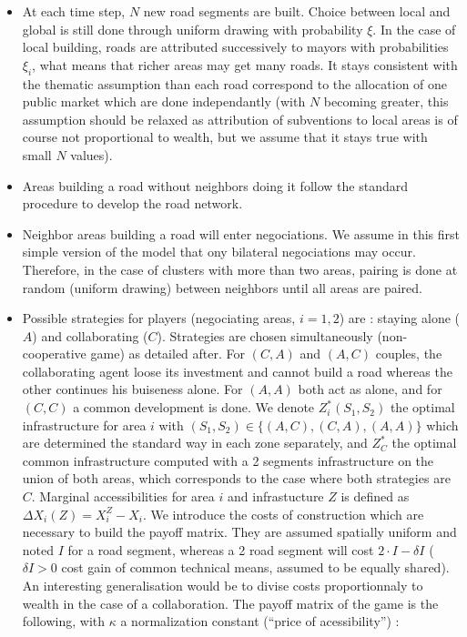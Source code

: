 \begin{itemize}

\item At each time step, $N$ new road segments are built. Choice between local and global is still done through uniform drawing with probability $\xi$. In the case of local building, roads are attributed successively to mayors with probabilities $\xi_i$, what means that richer areas may get many roads. It stays consistent with the thematic assumption than each road correspond to the allocation of one public market which are done independantly (with $N$ becoming greater, this assumption should be relaxed as attribution of subventions to local areas is of course not proportional to wealth, but we assume that it stays true with small $N$ values). 

\item Areas building a road without neighbors doing it follow the standard procedure to develop the road network.

\item Neighbor areas building a road will enter negociations. We assume in this first simple version of the model that ony bilateral negociations may occur. Therefore, in the case of clusters with more than two areas, pairing is done at random (uniform drawing) between neighbors until all areas are paired.

\item Possible strategies for players (negociating areas, $i=1,2$) are : staying alone ($A$) and collaborating ($C$). Strategies are chosen simultaneously (non-cooperative game) as detailed after. For $(C,A)$ and $(A,C)$ couples, the collaborating agent loose its investment and cannot build a road whereas the other continues his buiseness alone. For $(A,A)$ both act as alone, and for $(C,C)$ a common development is done. We denote $Z^{\ast}_i(S_1,S_2)$ the optimal infrastructure for area $i$ with $(S_1,S_2)\in \{(A,C),(C,A),(A,A)\}$ which are determined the standard way in each zone separately, and $Z^{\ast}_C$ the optimal common infrastructure computed with a 2 segments infrastructure on the union of both areas, which corresponds to the case where both strategies are $C$. Marginal accessibilities for area $i$ and infrastucture $Z$ is defined as $\Delta X_i(Z)=X^Z_i - X_i$. We introduce the costs of construction which are necessary to build the payoff matrix. They are assumed spatially uniform and noted $I$ for a road segment, whereas a 2 road segment will cost $2\cdot I - \delta I$ ($\delta I > 0$ cost gain of common technical means, assumed to be equally shared). An interesting generalisation would be to divise costs proportionnaly to wealth in the case of a collaboration. The payoff matrix of the game is the following, with $\kappa$ a normalization constant (``price of acessibility'') :


\end{itemize}
